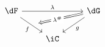\[\begin{tikzcd}
	\dF && \dG \\
	& \iC
	\arrow["\lambda", from=1-1, to=1-3]
	\arrow[""{name=0, anchor=center, inner sep=0}, "f"', from=1-1, to=2-2]
	\arrow["g", from=1-3, to=2-2]
	\arrow["{\lambda^{\#}}"{description}, shorten >=8pt, Rightarrow, from=1-3, to=0]
\end{tikzcd}\]